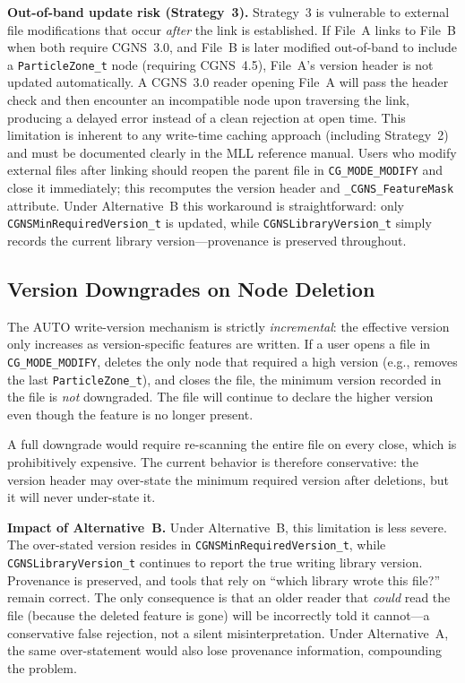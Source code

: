 \documentclass[11pt,letterpaper]{article}
\begin{document}
\textbf{Out-of-band update risk (Strategy~3).}
Strategy~3 is vulnerable to external file modifications that occur
\emph{after} the link is established.  If File~A links to File~B
when both require CGNS~3.0, and File~B is later modified out-of-band
to include a \texttt{ParticleZone\_t} node (requiring CGNS~4.5),
File~A's version header is not updated automatically.  A CGNS~3.0
reader opening File~A will pass the header check and then encounter
an incompatible node upon traversing the link, producing a delayed
error instead of a clean rejection at open time.  This limitation is
inherent to any write-time caching approach (including Strategy~2)
and must be documented clearly in the MLL reference manual.  Users
who modify external files after linking should reopen the parent file
in \texttt{CG\_MODE\_MODIFY} and close it immediately; this
recomputes the version header and \texttt{\_CGNS\_FeatureMask}
attribute.  Under Alternative~B this workaround is straightforward:
only \texttt{CGNSMinRequiredVersion\_t} is updated, while
\texttt{CGNSLibraryVersion\_t} simply records the current library
version---provenance is preserved throughout.

\subsection{Version Downgrades on Node Deletion}

The AUTO write-version mechanism is strictly \emph{incremental}: the
effective version only increases as version-specific features are
written.  If a user opens a file in \texttt{CG\_MODE\_MODIFY},
deletes the only node that required a high version (e.g., removes the
last \texttt{ParticleZone\_t}), and closes the file, the minimum
version recorded in the file is \emph{not} downgraded.  The file will
continue to declare the higher version even though the feature is no
longer present.

A full downgrade would require re-scanning the entire file on every
close, which is prohibitively expensive.  The current behavior is
therefore conservative: the version header may over-state the minimum
required version after deletions, but it will never under-state it.

\textbf{Impact of Alternative~B.}  Under Alternative~B, this
limitation is less severe.  The over-stated version resides in
\texttt{CGNSMinRequiredVersion\_t}, while
\texttt{CGNSLibraryVersion\_t} continues to report the true writing
library version.  Provenance is preserved, and tools that rely on
``which library wrote this file?'' remain correct.  The only
consequence is that an older reader that \emph{could} read the file
(because the deleted feature is gone) will be incorrectly told it
cannot---a conservative false rejection, not a silent
misinterpretation.  Under Alternative~A, the same over-statement
would also lose provenance information, compounding the problem.
\end{document}
